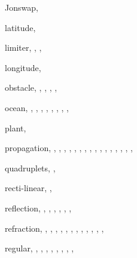\documentclass[12pt]{book}
\begin{document}
\begin{theindex}
  \indexspace

  \item Jonswap, 

  \indexspace

  \item latitude, 
  \item limiter, , , 
  \item longitude, 

  \indexspace

  \item obstacle, , , ,
		, 
  \item ocean, , , ,
		, , ,
		, ,

  \indexspace

  \item plant, 
  \item propagation, , ,
		, , ,
		, , ,
		, , ,
		, ,
		, ,
		, 

  \indexspace

  \item quadruplets, , 

  \indexspace

  \item recti-linear, , 
  \item reflection, , , ,
		, , ,
  \item refraction, , , ,
		, , ,
		, , ,
		, ,
		, 
  \item regular, , , ,
		, , ,
		, , 

  \indexspace


\end{theindex}
\end{document}
